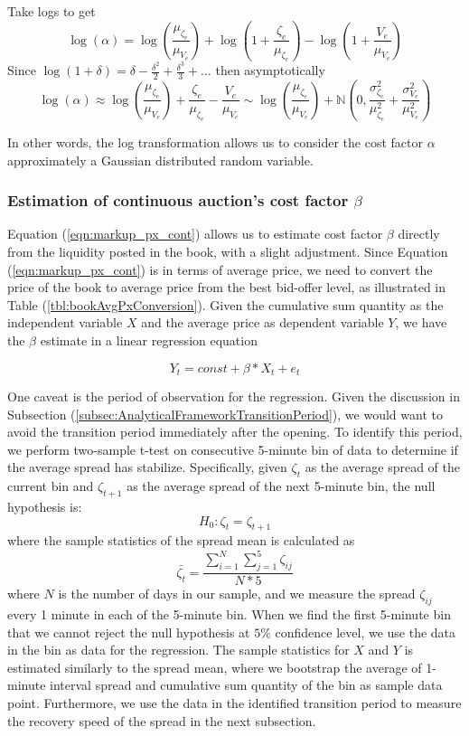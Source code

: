 \documentclass{article}
\begin{document}
Take logs to get
\[\log(\alpha) = \log \left(\frac{\mu_{\zeta_e}}{\mu_{V_e}} \right)
  + \log \left( 1+ \frac{\zeta_e}{\mu_{\zeta_e}} \right)
  - \log \left( 1+ \frac{V_e}{\mu_{V_e}} \right)
\]
Since $\log(1+\delta) = \delta - \frac{\delta^2}{2} + \frac{\delta^3}{3} + \dots $
then asymptotically
\[ \log(\alpha) \approx \log \left(\frac{\mu_{\zeta_e}}{\mu_{V_e}} \right)+ \frac{\zeta_e}{\mu_{\zeta_e}}  -
  \frac{V_e}{\mu_{V_e}}
  \sim \log \left(\frac{\mu_{\zeta_e}}{\mu_{V_e}} \right) + \mathbb{N} \left( 0, \frac{\sigma_{\zeta_e}^2}{\mu_{\zeta_e}^2} + \frac{\sigma_{V_e}^2}{\mu_{V_e}^2} \right)
\]

In other words, the log transformation allows us to consider the cost factor $\alpha$ approximately a Gaussian distributed random variable.

\subsubsection{Estimation of continuous auction's cost factor $\beta$}

Equation (\ref{eqn:markup_px_cont}) allows us to estimate cost factor $\beta$ directly from the liquidity posted in the book, with a slight adjustment. Since Equation (\ref{eqn:markup_px_cont}) is in terms of average price, we need to convert the price of the book to average price from the best bid-offer level, as illustrated in Table (\ref{tbl:bookAvgPxConversion}). Given the cumulative sum quantity as the independent variable $X$ and the average price as dependent variable $Y$, we have the $\beta$ estimate in a linear regression equation

\[
  Y_t = const + \beta * X_t + e_t
\]

One caveat is the period of observation for the regression. Given the discussion in Subsection (\ref{subsec:AnalyticalFrameworkTransitionPeriod}), we would want to avoid the transition period immediately after the opening. To identify this period, we perform two-sample t-test on consecutive 5-minute bin of data to determine if the average spread has stabilize. Specifically, given $\zeta_t$ as the average spread of the current bin and $\zeta_{t+1}$ as the average spread of the next 5-minute bin, the null hypothesis is:
\[
  H_0: \zeta_t = \zeta_{t+1}
\]
where the sample statistics of the spread mean is calculated as
\[
  \bar{\zeta_t} = \frac{\sum_{i=1}^N  \sum_{j=1}^5 \zeta_{ij}}{N*5}
\]
where $N$ is the number of days in our sample, and we measure the spread $\zeta_{ij}$ every 1 minute in each of the 5-minute bin. When we find the first 5-minute bin that we cannot reject the null hypothesis at $5 \%$ confidence level, we use the data in the bin as data for the regression. The sample statistics for $X$ and $Y$ is estimated similarly to the spread mean, where we bootstrap the average of 1-minute interval spread and cumulative sum quantity of the bin as sample data point. Furthermore, we use the data in the identified transition period to measure the recovery speed of the spread in the next subsection.
\end{document}
